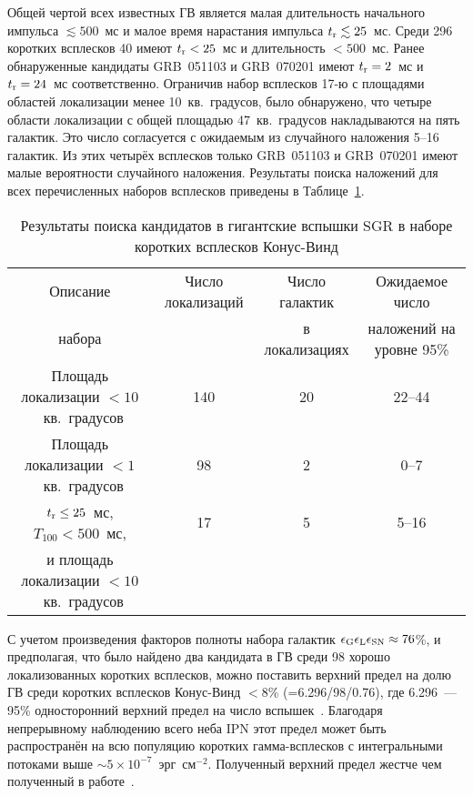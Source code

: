 Общей чертой всех известных ГВ является малая длительность начального импульса 
$\lesssim 500$~мс и малое время нарастания импульса $t_{{\mathrm{r}}} \lesssim 25$~мс. 
Среди 296 коротких всплесков 40 имеют $t_{{\mathrm{r}}}<25$~мс и длительность $<500$~мс. 
Ранее обнаруженные кандидаты GRB~051103 и GRB~070201 имеют $t_{{\mathrm{r}}}=2$~мс 
и~$t_{{\mathrm{r}}}=24$~мс соответственно. Ограничив набор всплесков 17-ю с площадями 
областей локализации менее 10~кв.~градусов, было обнаружено, что четыре области 
локализации с общей площадью 47~кв.~градусов накладываются на пять галактик. 
Это число согласуется с ожидаемым из случайного наложения 5--16 галактик. Из этих 
четырёх всплесков только GRB~051103 и GRB~070201 имеют малые вероятности случайного наложения.
Результаты поиска наложений для всех перечисленных наборов всплесков приведены 
в Таблице~\ref{tab:SearchResults}.

\begin{table}[h]
  \centering
  \scriptsize
  \caption{Результаты поиска кандидатов в гигантские вспышки SGR в 
  наборе коротких всплесков Конус-Винд}
  \label{tab:SearchResults}
  \begin{tabular}{cccc}
  \hline
  \hline
Описание & Число локализаций  & Число галактик & Ожидаемое число  \\
набора   &                    & в локализациях & наложений на уровне 95\% \\
\hline
Площадь локализации $<10$~кв.~градусов  & 140 & 20 & 22--44 \\
Площадь локализации $<1$~кв.~градусов   & 98 & 2 & 0--7\\
$t_{{\mathrm{r}}} \leq 25$~мс, $T_{100}<500$~мс, & 17 & 5 & 5--16\\
и площадь локализации $<10$~кв.~градусов & & & \\
\hline
\end{tabular}
\end{table}

С учетом произведения факторов полноты набора галактик $\epsilon_{{\mathrm{G}}} \epsilon_{{\mathrm{L}}} \epsilon_{{\mathrm{SN}}} \approx 76$\%, 
и предполагая, что было найдено два кандидата в ГВ среди 98 хорошо локализованных коротких всплесков, 
можно поставить верхний предел на долю ГВ среди коротких всплесков Конус-Винд 
$<8$\% (=6.296/98/0.76), где 6.296~--- 95\% односторонний верхний предел на 
число вспышек~\citep{Gehrels1986}. Благодаря непрерывному наблюдению всего неба IPN 
этот предел может быть распространён на всю популяцию коротких гамма-всплесков с 
интегральными потоками выше $\sim 5\times 10^{-7}$~эрг~см$^{-2}$. Полученный верхний 
предел жестче чем полученный в работе~\citep{Ofek2007}.

